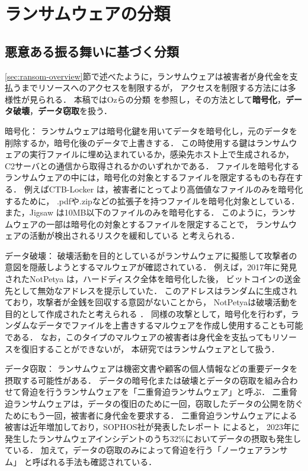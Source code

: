 \section{ランサムウェアの分類}
\subsection{悪意ある振る舞いに基づく分類}
\ref{sec:ransom-overview}節で述べたように，ランサムウェアは被害者が身代金を支払うまでリソースへのアクセスを制限するが，
アクセスを制限する方法には多様性が見られる．
本稿ではOzらの分類 \cite{Evolution-Ransomware} を参照し，その方法として\textbf{暗号化}，\textbf{データ破壊}，\textbf{データ窃取}を扱う．

暗号化：
ランサムウェアは暗号化鍵を用いてデータを暗号化し，元のデータを削除するか，暗号化後のデータで上書きする．
この時使用する鍵はランサムウェアの実行ファイルに埋め込まれているか，感染先ホスト上で生成されるか，C2サーバとの通信から取得されるかのいずれかである．
ファイルを暗号化するランサムウェアの中には，暗号化の対象とするファイルを限定するものも存在する．
例えばCTB-Locker \cite{ctb-locker} は，被害者にとってより高価値なファイルのみを暗号化するために，
.pdfや.zipなどの拡張子を持つファイルを暗号化対象としている．
また，Jigsaw \cite{byrne2017jigsaw} は10MB以下のファイルのみを暗号化する．
このように，ランサムウェアの一部は暗号化の対象とするファイルを限定することで，
ランサムウェアの活動が検出されるリスクを緩和している \cite{huang2017flashguard}と考えられる．

データ破壊：
破壊活動を目的としているがランサムウェアに擬態して攻撃者の意図を隠蔽しようとするマルウェアが確認されている．
例えば，2017年に発見されたNotPetya \cite{Petya-No22:online} は，ハードディスク全体を暗号化した後，
ビットコインの送金先として無効なアドレスを提示していた．
このアドレスはランダムに生成されており，攻撃者が金銭を回収する意図がないことから，
NotPetyaは破壊活動を目的として作成されたと考えられる \cite{Petya-No22:online}．
同様の攻撃として，暗号化を行わず，ランダムなデータでファイルを上書きするマルウェアを作成し使用することも可能である．
なお，このタイプのマルウェアの被害者は身代金を支払ってもリソースを復旧することができないが，
本研究ではランサムウェアとして扱う．

データ窃取：
ランサムウェアは機密文書や顧客の個人情報などの重要データを摂取する可能性がある．
データの暗号化または破壊とデータの窃取を組み合わせて脅迫を行うランサムウェアを「二重脅迫ランサムウェア」と呼ぶ．
二重脅迫ランサムウェアは，データの復旧のために一回，窃取したデータの公開を防ぐためにもう一回，被害者に身代金を要求する．
二重脅迫ランサムウェアによる被害は近年増加しており，SOPHOS社が発表したレポート \cite{sophos-report:online} によると，
2023年に発生したランサムウェアインシデントのうち32\%においてデータの摂取も発生している．
加えて，データの窃取のみによって脅迫を行う「ノーウェアランサム」\cite{nowhere-ransom} と呼ばれる手法も確認されている．

